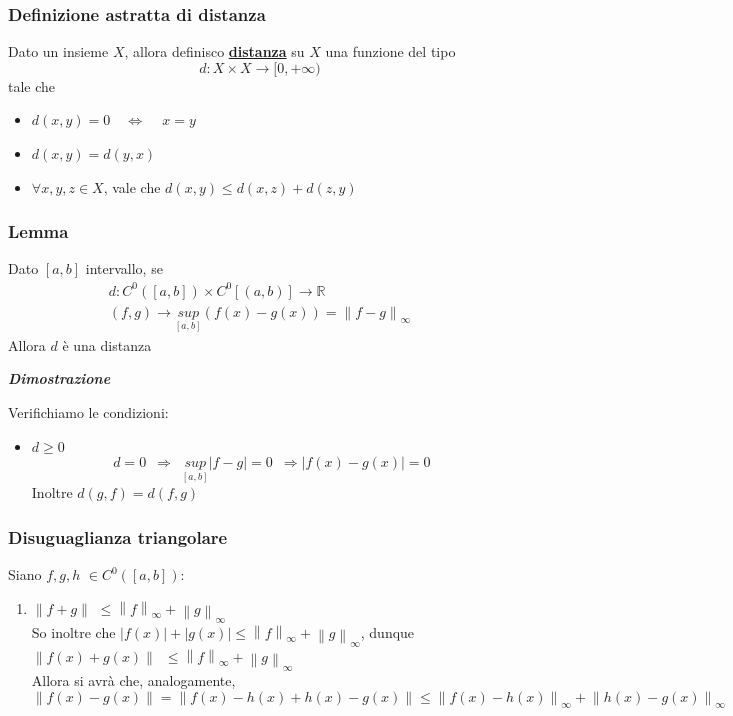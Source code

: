 \documentclass{article}
\theoremstyle{definition}
\newcommand{\R}{\mathbb{R}}
\begin{document}
\subsubsection{Definizione astratta di distanza}
Dato un insieme $X$, allora definisco \underline{\textbf{distanza}} su $X$ una funzione del tipo
\begin{equation}
    d:X \times X \to [0,+\infty)
\end{equation}
tale che
\begin{itemize}
    \item $d(x,y)=0 \,\,\,\,\,\, \Longleftrightarrow \,\,\,\,\,\,\, x=y$
    \item $d(x,y)=d(y,x)$
    \item $\forall x,y,z \in X$, vale che $d(x,y) \leqslant d(x,z)+d(z,y)$
\end{itemize}
\subsubsection{Lemma}
Dato $[a,b]$ intervallo, se
\begin{align}
    d: C^0([a,b]) \times C^0[(a,b)] \to \R \\
     (f,g) \to \underset{[a,b]}{sup}(f(x) - g(x)) = \left\|f-g\right\|_\infty
\end{align}
Allora $d$ è una distanza
\begin{center}
    \textbf{\textit{Dimostrazione}}
\end{center}
Verifichiamo le condizioni:
\begin{itemize}
\item $d \geqslant 0$
\begin{equation}
    d=0 \,\,\, \Longrightarrow \,\,\, \underset{[a,b]}{sup}|f-g|=0 \,\,\, \Longrightarrow |f(x)-g(x)|=0
\end{equation}
Inoltre $d(g,f)=d(f,g)$
\end{itemize}
\subsubsection{Disuguaglianza triangolare}
Siano $f,g,h \,\, \in C^0([a,b])$:
\begin{enumerate}
    \item $\left\|f+g\right\| \,\, \leqslant \left\|f\right\|_\infty + \left\|g\right\|_\infty$
    \\
    So inoltre che $|f(x)|+|g(x)| \leqslant \left\|f\right\|_\infty + \left\|g\right\|_\infty$, dunque $\left\|f(x)+g(x)\right\| \,\,\, \leqslant \left\|f\right\|_\infty + \left\|g\right\|_\infty$
    \\
    Allora si avrà che, analogamente,
    \begin{equation}
        \left\|f(x)-g(x)\right\| = \left\|f(x)-h(x)+h(x)-g(x)\right\| \leqslant \left\|f(x) - h(x)\right\|_\infty + \left\|h(x)-g(x)\right\|_\infty 
    \end{equation}




\end{enumerate}
\end{document}
